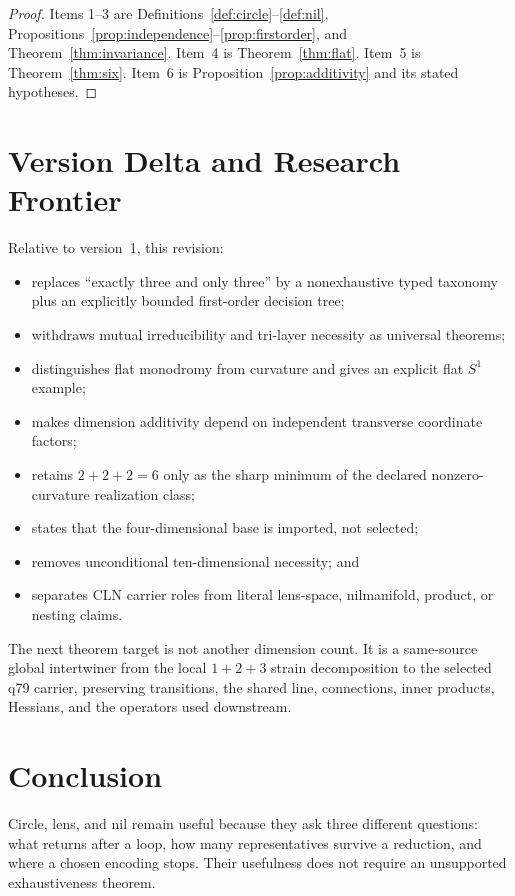 \documentclass[11pt]{article}
\begin{document}
\begin{proof}
Items 1--3 are Definitions~\ref{def:circle}--\ref{def:nil},
Propositions~\ref{prop:independence}--\ref{prop:firstorder}, and
Theorem~\ref{thm:invariance}.  Item~4 is Theorem~\ref{thm:flat}.  Item~5 is
Theorem~\ref{thm:six}.  Item~6 is
Proposition~\ref{prop:additivity} and its stated hypotheses.
\end{proof}

\section{Version Delta and Research Frontier}

Relative to version~1, this revision:
\begin{itemize}
\item replaces ``exactly three and only three'' by a nonexhaustive typed
taxonomy plus an explicitly bounded first-order decision tree;
\item withdraws mutual irreducibility and tri-layer necessity as universal
theorems;
\item distinguishes flat monodromy from curvature and gives an explicit flat
$S^1$ example;
\item makes dimension additivity depend on independent transverse coordinate
factors;
\item retains $2+2+2=6$ only as the sharp minimum of the declared
nonzero-curvature realization class;
\item states that the four-dimensional base is imported, not selected;
\item removes unconditional ten-dimensional necessity; and
\item separates CLN carrier roles from literal lens-space, nilmanifold, product,
or nesting claims.
\end{itemize}

The next theorem target is not another dimension count.  It is a same-source
global intertwiner from the local $1+2+3$ strain decomposition to the selected
q79 carrier, preserving transitions, the shared line, connections, inner
products, Hessians, and the operators used downstream.

\section{Conclusion}

Circle, lens, and nil remain useful because they ask three different questions:
what returns after a loop, how many representatives survive a reduction, and
where a chosen encoding stops.  Their usefulness does not require an
unsupported exhaustiveness theorem.
\end{document}
